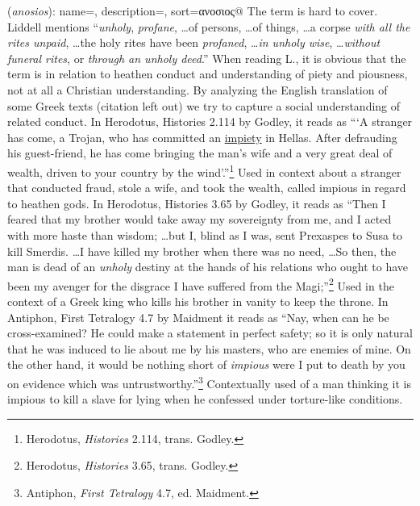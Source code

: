 \item[Impiously wicked,]

(\textit{anosios}):
{
    name=,
    description={},
    sort=ανοσιος@
}
The term is hard to cover. Liddell mentions  ``\emph{unholy}, \emph{profane}, \ldots of persons, \ldots of things, \ldots a corpse \emph{with all the rites unpaid}, \ldots the holy rites have been \emph{profaned}, \ldots \emph{in unholy wise}, \ldots \emph{without funeral rites}, or \emph{through an unholy deed}.'' When reading L., it is obvious that the term is in relation to heathen conduct and understanding of piety and piousness, not at all a Christian understanding. 
By analyzing the English translation of some Greek texts (citation left out) we try to capture a social understanding of related conduct.
In Herodotus, Histories 2.114 by Godley, it reads as ```A stranger has come, a Trojan, who has committed an \underline{impiety} in Hellas. After defrauding his guest-friend, he has come bringing the man's wife and a very great deal of wealth, driven to your country by the wind'.''\footnote{Herodotus, \emph{Histories} 2.114, trans. Godley.} Used in context about a stranger that conducted fraud, stole a wife, and took the wealth, called impious in regard to heathen gods.
In Herodotus, Histories 3.65 by Godley, it reads as ``Then I feared that my brother would take away my sovereignty from me, and I acted with more haste than wisdom; \ldots but I, blind as I was, sent Prexaspes to Susa to kill Smerdis. \ldots I have killed my brother when there was no need, \ldots So then, the man is dead of an \emph{unholy} destiny at the hands of his relations who ought to have been my avenger for the disgrace I have suffered from the Magi;''\footnote{Herodotus, \emph{Histories} 3.65, trans. Godley.} Used in the context of a Greek king who kills his brother in vanity to keep the throne.
In Antiphon, First Tetralogy 4.7 by Maidment it reads as ``Nay, when can he be cross-examined? He could make a statement in perfect safety; so it is only natural that he was induced to lie about me by his masters, who are enemies of mine. On the other hand, it would be nothing short of \emph{impious} were I put to death by you on evidence which was untrustworthy.''\footnote{Antiphon, \emph{First Tetralogy} 4.7, ed. Maidment.} Contextually used of a man thinking it is impious to kill a slave for lying when he confessed under torture-like conditions.
